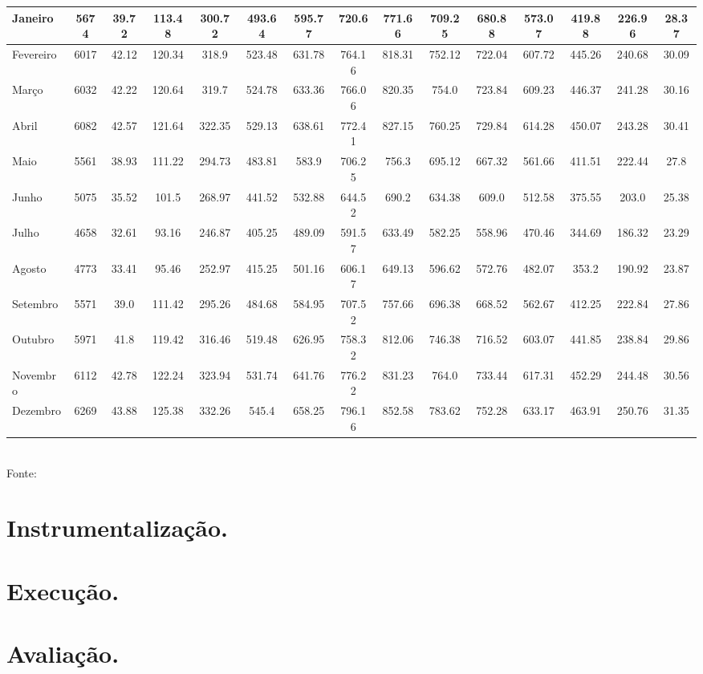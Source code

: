 \begin{table}[h]
\begin{tabular}{l c | *{13}{c} }
	\hline
	Janeiro & 5674 & 39.72 & 113.48 & 300.72 & 493.64 & 595.77 & 720.6 & 771.66 & 709.25 & 680.88 & 573.07 & 419.88 & 226.96 & 28.37 \\
	\hline
	Fevereiro & 6017 & 42.12 & 120.34 & 318.9 & 523.48 & 631.78 & 764.16 & 818.31 & 752.12 & 722.04 & 607.72 & 445.26 & 240.68 & 30.09\\
	\hline
	Março & 6032 &  42.22 & 120.64 & 319.7 & 524.78 & 633.36 & 766.06 & 820.35 & 754.0 & 723.84 & 609.23 & 446.37 & 241.28 & 30.16\\
	\hline
	Abril & 6082 & 42.57 & 121.64 & 322.35 & 529.13 & 638.61 & 772.41 & 827.15 & 760.25 & 729.84 & 614.28 & 450.07 & 243.28 & 30.41 \\
	\hline
	Maio & 5561 & 38.93 & 111.22 & 294.73 & 483.81 & 583.9 & 706.25 & 756.3 & 695.12 & 667.32 & 561.66 & 411.51 & 222.44 & 27.8 \\
	\hline
	Junho & 5075 & 35.52 & 101.5 & 268.97 & 441.52 & 532.88 & 644.52 & 690.2 & 634.38 & 609.0 & 512.58 & 375.55 & 203.0 & 25.38 \\
	\hline
	Julho & 4658 & 32.61 & 93.16 & 246.87 & 405.25 & 489.09 & 591.57 & 633.49 & 582.25 & 558.96 & 470.46 & 344.69 & 186.32 & 23.29 \\
	\hline
	Agosto & 4773 & 33.41 & 95.46 & 252.97 & 415.25 & 501.16 & 606.17 & 649.13 & 596.62 & 572.76 & 482.07 & 353.2 & 190.92 & 23.87 \\
	\hline
	Setembro & 5571 & 39.0 & 111.42 & 295.26 & 484.68 & 584.95 & 707.52 & 757.66 & 696.38 & 668.52 & 562.67 & 412.25 & 222.84 & 27.86 \\
	\hline
	Outubro & 5971 & 41.8 & 119.42 & 316.46 & 519.48 & 626.95 & 758.32 & 812.06 & 746.38 & 716.52 & 603.07 & 441.85 & 238.84 & 29.86 \\
	\hline
	Novembro & 6112 & 42.78 & 122.24 & 323.94 & 531.74 & 641.76 & 776.22 & 831.23 & 764.0 & 733.44 & 617.31 & 452.29 & 244.48 & 30.56 \\
	\hline
	Dezembro & 6269 & 43.88 & 125.38 & 332.26 & 545.4 & 658.25 & 796.16 & 852.58 & 783.62 & 752.28 & 633.17 & 463.91 & 250.76 & 31.35 \\
\bottomrule
\end{tabular}
\label{table:cap6distribuicaonatal}
\\
\footnotesize Fonte:\cite{martins2017atlas}

\end{table}
\endgroup




\section{Instrumentalização.}
\section{Execução.}
\section{Avaliação.}
 